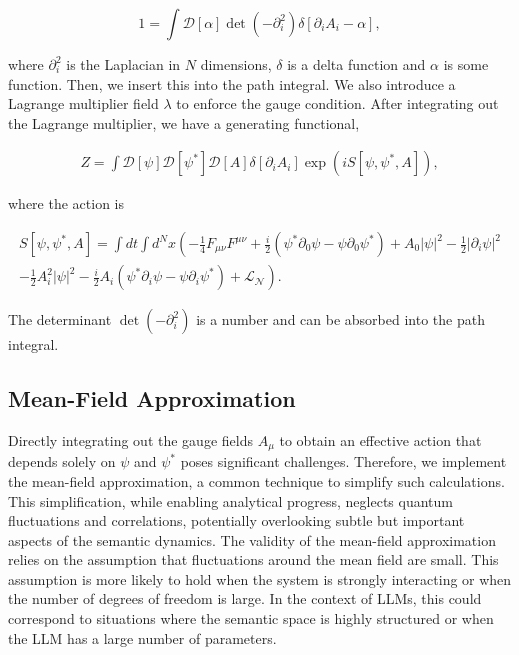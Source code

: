 \documentclass[prd,amsmath,amssymb,12pt]{revtex4}
\begin{document}
\begin{equation}
1 = \int \mathcal{D}[\alpha] \det(-\partial_i^2) \delta\left[\partial_i A_i - \alpha\right],
\end{equation}

\noindent
where $\partial_i^2$ is the Laplacian in $N$ dimensions, $\delta$ is a delta function and $\alpha$ is some function. Then, we insert this into the
path integral. We also introduce a Lagrange multiplier field $\lambda$ to enforce the gauge condition.
After integrating out the Lagrange multiplier, we have a generating functional,

\begin{equation}
\begin{split}
Z = \int  \mathcal{D}[\psi] \mathcal{D}[\psi^*] \mathcal{D}[A]  \delta\left[\partial_i A_i \right]
 \exp\left(i S[\psi, \psi^*, A] \right),
\end{split}
\end{equation}

\noindent
where the action is

\begin{equation}
\begin{split}
S[\psi, \psi^*, A] = \int dt \int d^{N}x \left( - \frac{1}{4}  F_{\mu\nu} F^{\mu\nu} +\frac{i}{2} (
    \psi^* \partial_0 \psi
- \psi \partial_0 \psi^* ) + A_0 |\psi|^2 - \frac{1}{2}  |\partial_i \psi|^2  \right.  \\
 \left. - \frac{1}{2}  A_i^2 |\psi|^2 - \frac{i}{2}  A_i (\psi^* \partial_i \psi - \psi \partial_i \psi^*)
 +\mathcal{L_{N}} \right).
\end{split}
\end{equation}

\noindent
The determinant $\det(-\partial_i^2)$ is a number and can be absorbed into the path integral.

\subsection{Mean-Field Approximation}

Directly integrating out the gauge fields $A_\mu$ to obtain an effective action that depends
solely on $\psi$ and $\psi^*$ poses significant challenges.
Therefore, we implement the mean-field approximation, a common technique to simplify such calculations.
This simplification, while enabling analytical progress, neglects quantum fluctuations and correlations,
potentially overlooking subtle but important aspects of the semantic dynamics. The validity of the mean-field
approximation relies on the assumption that fluctuations around the mean field are small. This assumption is more
likely to hold when the system is strongly interacting or when the number of degrees of freedom is large.
In the context of LLMs, this could correspond to situations where the semantic space is highly structured or when
the LLM has a large number of parameters.
\end{document}
